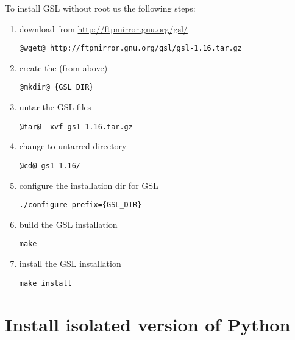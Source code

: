 To install GSL without root us the following steps:

\begin{enumerate}
\item download from \url{http://ftpmirror.gnu.org/gsl/}

\begin{lstlisting}[style=bashstyle]
@wget@ http://ftpmirror.gnu.org/gsl/gsl-1.16.tar.gz
\end{lstlisting}

\item create the  (from above)
\begin{lstlisting}[style=bashstyle]
@mkdir@ {GSL_DIR}
\end{lstlisting}

\item untar the GSL files
\begin{lstlisting}[style=bashstyle]
@tar@ -xvf gs1-1.16.tar.gz
\end{lstlisting}

\item change to untarred directory
\begin{lstlisting}[style=bashstyle]
@cd@ gs1-1.16/
\end{lstlisting}

\item configure the installation dir for GSL
\begin{lstlisting}[style=bashstyle]
./configure prefix={GSL_DIR}
\end{lstlisting}

\item build the GSL installation
\begin{lstlisting}[style=bashstyle]
make
\end{lstlisting}

\item install the GSL installation
\begin{lstlisting}[style=bashstyle]
make install
\end{lstlisting}

\end{enumerate}

\section{Install isolated version of Python}
\label{section:install-python}

